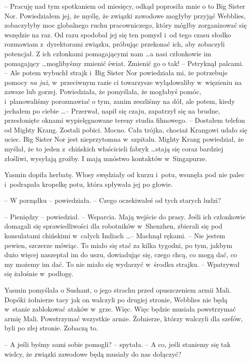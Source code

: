 \documentclass[oneside,polish,11pt,rmheadings]{mwbk}
\begin{document}
-- Pracuję nad tym spotkaniem od miesięcy, odkąd poprosiła mnie o to Big Sister Nor. Powiedziałem jej, że myślę, że związki zawodowe mogłyby przyjąć Webblies, zobaczyłyby moc globalnego ruchu pracowniczego, który mógłby zorganizować się wszędzie na raz. Od razu spodobał jej się ten pomysł i~od tego czasu słodko rozmawiam z~dyrektorami związku, próbując przekonać ich, aby zobaczyli potencjał. Z ich członkami pomagającymi nam  \ldots  a nasi członkowie im pomagający  \ldots  moglibyśmy zmienić świat. Zmienić go o tak! -- Pstryknął palcami. -- Ale potem wybuchł strajk i~Big Sister Nor powiedziała mi, że potrzebuje pomocy \textit{na już}, w~przeciwnym razie ci towarzysze wylądowaliby w~więzieniu na zawsze lub gorzej. Powiedziała, że pomyślała, że mogłabyś pomóc, i~planowaliśmy porozmawiać o tym, zanim zeszliśmy na dół, ale potem, kiedy jechałem po ciebie \ldots  -- Przerwał, napił się czaju, zapatrzył się na brudne, przesłonięte oknami wypielęgnowane tereny studia filmowego. -- Dostałem telefon od Mighty Krang. Zostali pobici. Mocno. Cała trójka, chociaż Krangowi udało się uciec. Big Sister Nor jest nieprzytomna w~szpitalu. Mighty Krang powiedział, że myślał, że to jeden z~chińskich właścicieli fabryk  \ldots  stają się coraz bardziej złośliwi, wysyłają groźby. I mają mnóstwo kontaktów w~Singapurze.

Yasmin dopiła herbatę. Włosy swędziały od kurzu i~potu, wsunęła pod nie palec i~podrapała kropelkę potu, która spływała jej po głowie. 

-- W porządku -- powiedziała. -- Czego oczekiwałeś od tych starych ludzi?

-- Pieniędzy -- powiedział. -- Wsparcia. Mają wejście do prasy. Jeśli ich członkowie domagali się sprawiedliwości dla robotników w~Shenzhen, zbierali się pod konsulatami chińskimi w~całych Indiach \ldots  -- Machnął rękami. -- Nie jestem pewien, szczerze mówiąc. To miało się stać za kilka tygodni, po tym, jakbym dużo więcej naszeptał im do uszu, dowiadując się, czego chcą, co mogą dać, co my możemy im dać. To nie miało się wydarzyć w~środku strajku. -- Wpatrywał się żałośnie w~podłogę.

Yasmin pomyślała o Sushant, o jego strachu przed opuszczeniem armii Mali. Dopóki żołnierze tacy jak on walczyli po drugiej stronie, Webblies nie będą w~stanie zablokować ataków w~grze. Więc. Więc będzie musiała powstrzymać armię Mali. Powstrzymać wszystkie armie. Żołnierze, którzy walczyli dla szefów, byli po złej stronie. Zobaczą to.

-- A jeśli byśmy sami sobie pomogli? -- spytała. -- A co, jeśli staniemy się tak wielcy, że związki zawodowe będą musiały do nas dołączyć?
\end{document}
